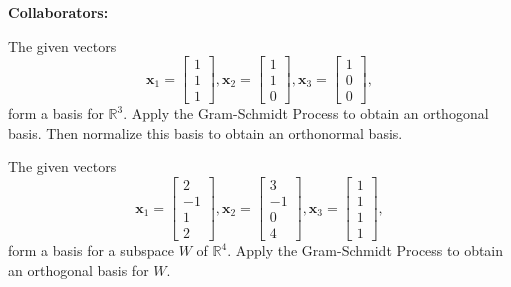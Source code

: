 \documentclass[11pt,letterpaper,boxed]{hmcpset}
\newcommand{\R}{\mathbb{R}}
\begin{document}
\noindent\textbf{Collaborators:} 


\begin{problem}[Poole 5.3 \#4]
The given vectors
\[
	\mathbf{x}_1 = \begin{bmatrix}1\\1\\1\end{bmatrix}, \mathbf{x}_2 = \begin{bmatrix}1\\1\\0\end{bmatrix}, \mathbf{x}_3 = \begin{bmatrix}1\\0\\0\end{bmatrix},
\]
form a basis for $\R^3$. Apply the Gram-Schmidt Process to obtain an orthogonal basis. Then normalize this basis to obtain an orthonormal basis.
\end{problem}

\begin{solution}
\vfill
\end{solution}
\newpage

\begin{problem}[Poole 5.3 \#6]
The given vectors
\[
	\mathbf{x}_1 = \begin{bmatrix}2\\-1\\1\\2\end{bmatrix}, \mathbf{x}_2 = \begin{bmatrix}3\\-1\\0\\4\end{bmatrix}, \mathbf{x}_3 = \begin{bmatrix}1\\1\\1\\1\end{bmatrix},
\]
form a basis for a subspace $W$ of $\R^4$. Apply the Gram-Schmidt Process to obtain an orthogonal basis for $W$.
\end{problem}

\begin{solution}
\vfill
\end{solution}
\newpage
\end{document}
